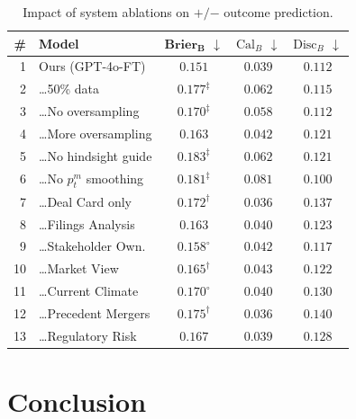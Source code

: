 \documentclass{article}
\theoremstyle{plain}
\theoremstyle{definition}
\theoremstyle{remark}
\newcommand{\Plus}{\boldsymbol{\mathrm{+}}}
\newcommand{\Minus}{\boldsymbol{\mathrm{-}}}
\begin{document}
\begin{table}[t]
\caption{Impact of system ablations on $\Plus/\Minus$ outcome prediction.}
\label{tab:ablations}
\centering
\small
\begin{tabularx}{\columnwidth}{@{} r X ccc @{}}
\toprule
\textbf{\#}  & \textbf{Model}  & $\mathbf{Brier_B}$ $\downarrow$  & $\text{Cal}_B$ $\downarrow$  & $\text{Disc}_B$ $\downarrow$ \\
\midrule
1  & Ours (GPT-4o-FT)               & $\mathbf{0.151}$               & $0.039$ & $\mathbf{0.112}$ \\
2 & \dots 50\% data                & $0.177^{\ddagger}$             & $0.062$ & $0.115$ \\
3 & \dots No oversampling          & $0.170^{\ddagger}$             & $0.058$ & $\mathbf{0.112}$ \\
4 & \dots More oversampling        & $0.163$                        & $0.042$ & $0.121$ \\
5 & \dots No hindsight guide & $0.183^{\ddagger}$ & $0.062$ & $0.121$ \\
6 & \dots No $p^m_t$ smoothing & $0.181^{\ddagger}$ & $0.081$ & $0.100$ \\
7 & \dots Deal Card only      & $0.172^{\dagger}$              & $\mathbf{0.036}$ & $0.137$ \\
8 & \dots Filings Analysis    & $0.163$                        & $0.040$ & $0.123$ \\
9 & \dots Stakeholder Own.        & $0.158^{\circ}$                & $0.042$ & $0.117$ \\
10 & \dots Market View         & $0.165^{\dagger}$              & $0.043$ & $0.122$ \\
11 & \dots Current Climate     & $0.170^{\circ}$                & $0.040$ & $0.130$ \\
12 & \dots Precedent Mergers     & $0.175^{\dagger}$              & $\mathbf{0.036}$ & $0.140$ \\
13 & \dots Regulatory Risk    & $0.167$                        & $0.039$ & $0.128$ \\

\bottomrule
\end{tabularx}
\end{table}




\section{Conclusion}
\end{document}
